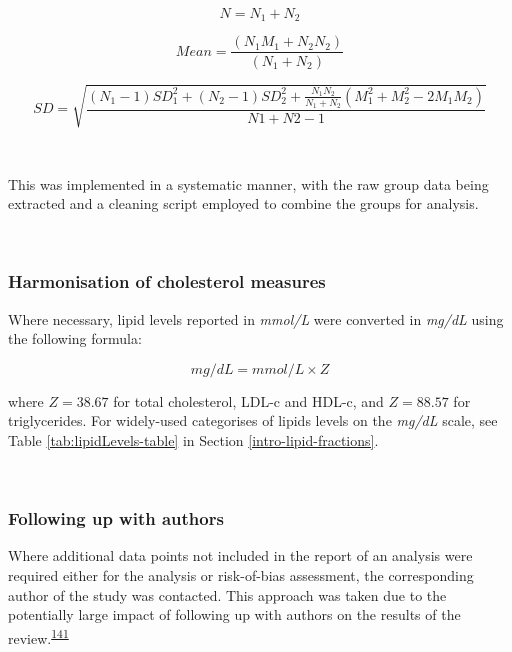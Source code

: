 \documentclass[a4paper, twoside]{templates/ociamthesis}
\begin{document}
\begin{equation}
N = N_1 + N_2
  \label{eq:combiningGroups1}
\end{equation}

\begin{equation}
Mean = \frac{(N_1M_1 + N_2N_2)}{(N_1 + N_2)}
  \label{eq:combiningGroups2}
\end{equation}

\begin{equation}
SD = \sqrt{\frac{(N_1-1)SD_1^2 + (N_2-1)SD_2^2 + \frac{N_1N_2}{N_1 + N_2}(M_1^2 + M_2^2 - 2M_1M_2)}{N1 + N2 -1}}
  \label{eq:combiningGroups3}
\end{equation}

~

This was implemented in a systematic manner, with the raw group data being extracted and a cleaning script employed to combine the groups for analysis.

~

\hypertarget{harmonisation-of-cholesterol-measures}{%
\subsubsection{Harmonisation of cholesterol measures}\label{harmonisation-of-cholesterol-measures}}

Where necessary, lipid levels reported in \emph{mmol/L} were converted in \emph{mg/dL} using the following formula:

\begin{equation} 
  mg/dL = mmol/L \times{} Z
  \label{eq:lipidConversion}
\end{equation}

where \(Z = 38.67\) for total cholesterol, LDL-c and HDL-c, and \(Z = 88.57\) for triglycerides. For widely-used categorises of lipids levels on the \emph{mg/dL} scale, see Table \ref{tab:lipidLevels-table} in Section \ref{intro-lipid-fractions}.

~

\hypertarget{contacting-authors}{%
\subsubsection{Following up with authors}\label{contacting-authors}}

Where additional data points not included in the report of an analysis were required either for the analysis or risk-of-bias assessment, the corresponding author of the study was contacted. This approach was taken due to the potentially large impact of following up with authors on the results of the review.\textsuperscript{\protect\hyperlink{ref-reynders2019}{141}}
\end{document}
